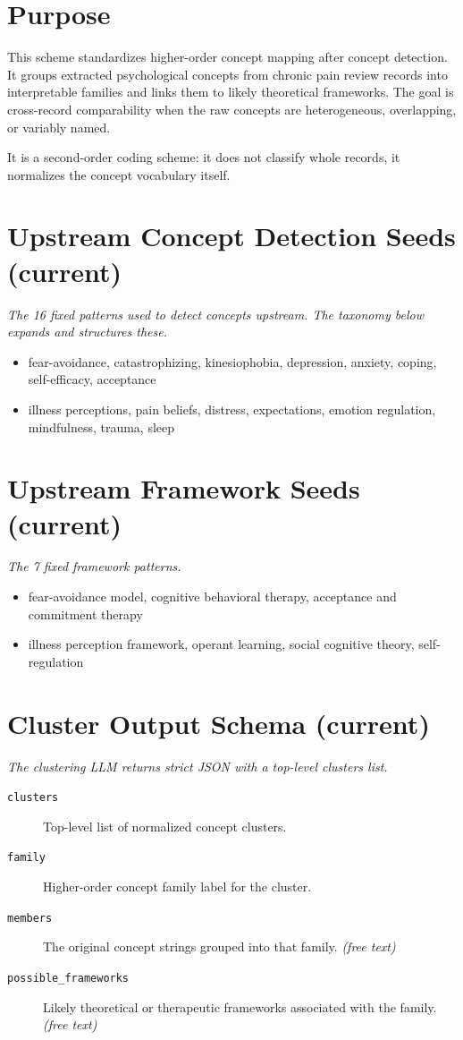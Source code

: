 \documentclass[11pt]{article}
\begin{document}
\section*{Purpose}
This scheme standardizes higher-order concept mapping after concept detection. It groups extracted psychological concepts from chronic pain review records into interpretable families and links them to likely theoretical frameworks. The goal is cross-record comparability when the raw concepts are heterogeneous, overlapping, or variably named.

It is a second-order coding scheme: it does not classify whole records, it normalizes the concept vocabulary itself.


\section*{Upstream Concept Detection Seeds (current)}
{\small\itshape The 16 fixed patterns used to detect concepts upstream. The taxonomy below expands and structures these.}\par\smallskip
\begin{itemize}
\item fear-avoidance, catastrophizing, kinesiophobia, depression, anxiety, coping, self-efficacy, acceptance
\item illness perceptions, pain beliefs, distress, expectations, emotion regulation, mindfulness, trauma, sleep
\end{itemize}

\section*{Upstream Framework Seeds (current)}
{\small\itshape The 7 fixed framework patterns.}\par\smallskip
\begin{itemize}
\item fear-avoidance model, cognitive behavioral therapy, acceptance and commitment therapy
\item illness perception framework, operant learning, social cognitive theory, self-regulation
\end{itemize}

\section*{Cluster Output Schema (current)}
{\small\itshape The clustering LLM returns strict JSON with a top-level clusters list.}\par\smallskip
\begin{description}
\item[\texttt{clusters}] Top-level list of normalized concept clusters.
\item[\texttt{family}] Higher-order concept family label for the cluster.
\item[\texttt{members}] The original concept strings grouped into that family. \textit{(free text)}
\item[\texttt{possible\_frameworks}] Likely theoretical or therapeutic frameworks associated with the family. \textit{(free text)}
\end{description}
\end{document}

